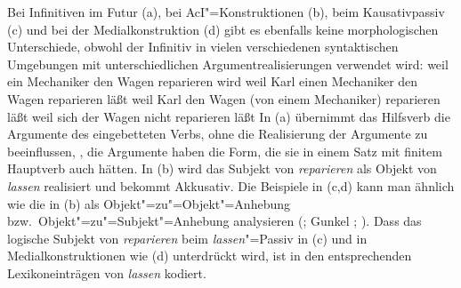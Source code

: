Bei Infinitiven im Futur (a), bei AcI"=Konstruktionen (b), 
beim Kausativpassiv (c)
und bei der Medialkonstruktion (d) gibt es ebenfalls
keine morphologischen Unterschiede, obwohl der Infinitiv in vielen verschiedenen 
syntaktischen Umgebungen mit unterschiedlichen Argumentrealisierungen verwendet wird:
\eal
\label{bsp-kasus-reparieren}
\ex weil    ein Mechaniker     den Wagen     reparieren wird
\ex weil    Karl       einen Mechaniker     den Wagen     reparieren läßt
\ex weil    Karl       den Wagen     (von einem Mechaniker) reparieren läßt
\ex weil    sich der Wagen     nicht reparieren läßt
\zl
In (a) übernimmt das Hilfsverb die Argumente des eingebetteten Verbs, ohne die Realisierung
der Argumente zu beeinflussen, \dash, die Argumente haben die Form, die sie in einem Satz mit finitem
Hauptverb auch hätten. In (b) wird das Subjekt
von \emph{reparieren} als Objekt von \emph{lassen} realisiert und bekommt Akkusativ.
Die Beispiele in (c,d) kann man ähnlich wie die in (b)
als Objekt"=zu"=Objekt"=Anhebung
bzw.\ Objekt"=zu"=Subjekt"=Anhebung analysieren (\citealp[]{Bierwisch90a}; Gunkel \citeyear[]{Gunkel99a}; \citeyear[Kapitel~4.4.2]{Gunkel2003b}).
Dass das logische Subjekt von \emph{reparieren} beim \emph{lassen}"=Passiv in (c)
und in Medialkonstruktionen wie (d) unterdrückt wird, ist in den entsprechenden Lexikoneinträgen
von \emph{lassen} kodiert. 

